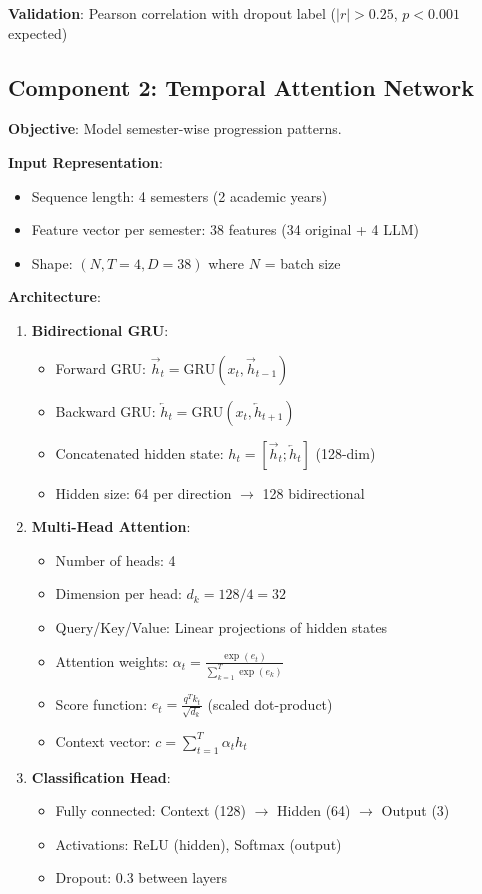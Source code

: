 \textbf{Validation}: Pearson correlation with dropout label ($|r| > 0.25$, $p < 0.001$ expected)

\subsection{Component 2: Temporal Attention Network}

\textbf{Objective}: Model semester-wise progression patterns.

\textbf{Input Representation}:
\begin{itemize}
\item Sequence length: 4 semesters (2 academic years)
\item Feature vector per semester: 38 features (34 original + 4 LLM)
\item Shape: $(N, T=4, D=38)$ where $N$ = batch size
\end{itemize}

\textbf{Architecture}:

\begin{enumerate}
\item \textbf{Bidirectional GRU}:
\begin{itemize}
\item Forward GRU: $\overrightarrow{h}_t = \text{GRU}(x_t, \overrightarrow{h}_{t-1})$
\item Backward GRU: $\overleftarrow{h}_t = \text{GRU}(x_t, \overleftarrow{h}_{t+1})$
\item Concatenated hidden state: $h_t = [\overrightarrow{h}_t; \overleftarrow{h}_t]$ (128-dim)
\item Hidden size: 64 per direction $\rightarrow$ 128 bidirectional
\end{itemize}

\item \textbf{Multi-Head Attention}:
\begin{itemize}
\item Number of heads: 4
\item Dimension per head: $d_k = 128 / 4 = 32$
\item Query/Key/Value: Linear projections of hidden states
\item Attention weights: $\alpha_t = \frac{\exp(e_t)}{\sum_{k=1}^{T} \exp(e_k)}$
\item Score function: $e_t = \frac{q^T k_t}{\sqrt{d_k}}$ (scaled dot-product)
\item Context vector: $c = \sum_{t=1}^{T} \alpha_t h_t$
\end{itemize}

\item \textbf{Classification Head}:
\begin{itemize}
\item Fully connected: Context (128) $\rightarrow$ Hidden (64) $\rightarrow$ Output (3)
\item Activations: ReLU (hidden), Softmax (output)
\item Dropout: 0.3 between layers
\end{itemize}
\end{enumerate}

